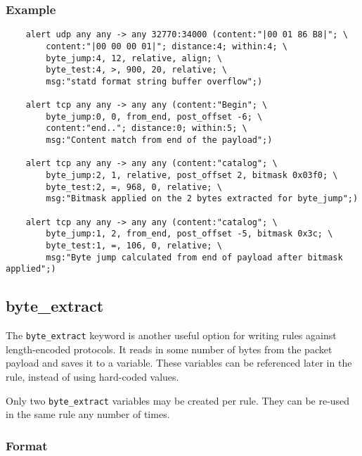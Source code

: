 \documentclass[english]{report}
\newenvironment{note}{
\samepage
    \vspace{10pt}{\textsf{
        {\hspace{7pt}\Huge{$\triangle$\hspace{-12.5pt}{\Large{$^!$}}}}\hspace{5pt}
        {\Large{NOTE}}
    }
    }
   \begin{center}
    \par\vspace{-17pt}

    \begin{lrbox}{\savepar}
    \begin{minipage}[r]{6in}
}
{
    \end{minipage}
    \end{lrbox}
    \fbox{
        \usebox{
            \savepar
	}
    }
    \par\vskip10pt
    \end{center}
}
\newenvironment{note}{
        \begin{rawhtml}
        <p><table border="1"><tr><td><b>
        Note:&nbsp;&nbsp;</b>
        \end{rawhtml}
}{
        \begin{rawhtml}
        </b></td></tr></table></p>
        \end{rawhtml}
}
\begin{document}
\subsubsection{Example}

\begin{verbatim}
    alert udp any any -> any 32770:34000 (content:"|00 01 86 B8|"; \
        content:"|00 00 00 01|"; distance:4; within:4; \
        byte_jump:4, 12, relative, align; \
        byte_test:4, >, 900, 20, relative; \
        msg:"statd format string buffer overflow";)

    alert tcp any any -> any any (content:"Begin"; \
        byte_jump:0, 0, from_end, post_offset -6; \
        content:"end.."; distance:0; within:5; \
        msg:"Content match from end of the payload";)

    alert tcp any any -> any any (content:"catalog"; \
        byte_jump:2, 1, relative, post_offset 2, bitmask 0x03f0; \
        byte_test:2, =, 968, 0, relative; \
        msg:"Bitmask applied on the 2 bytes extracted for byte_jump";)

    alert tcp any any -> any any (content:"catalog"; \
        byte_jump:1, 2, from_end, post_offset -5, bitmask 0x3c; \
        byte_test:1, =, 106, 0, relative; \
        msg:"Byte jump calculated from end of payload after bitmask applied";)
\end{verbatim}

\subsection{byte\_extract}
\label{byte_extract}

The \texttt{byte\_extract} keyword is another useful option for writing rules
against length-encoded protocols. It reads in some number of bytes from the
packet payload and saves it to a variable. These variables can be referenced
later in the rule, instead of using hard-coded values.

\begin{note}

Only two \texttt{byte\_extract} variables may be created per rule. They can be
re-used in the same rule any number of times.

\end{note}

\subsubsection{Format}
\end{document}
